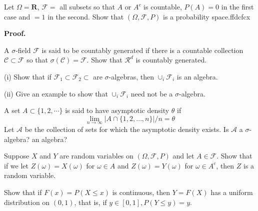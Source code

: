 \documentclass[en, normal, 11pt, black]{elegantnote}
\newenvironment{exercise}[1]{\begin{tcolorbox}[title=#1]}{\end{tcolorbox}}
\renewcommand{\proof}{\textbf{Proof. }}
\begin{document}
    \begin{exercise}{1.1.1}
        Let $\Omega=\mathbf{R}$, $\mathcal{F}=$ all subsets so that $A$ or $A^c$ is countable, $P(A) = 0$ in the first case and $= 1$ in the second. Show that $(\Omega,\mathcal{F},P)$ is a probability space.ffdcfcx
    \end{exercise}
    \proof

    \begin{exercise}{1.1.3}
        A $\sigma$-field $\mathcal{F}$ is said to be countably generated if there is a countable collection $\mathcal{C} \subset \mathcal{F}$ so that $\sigma(\mathcal{C}) = \mathcal{F}$. Show that $\mathcal{R}^d$ is countably generated. 
    \end{exercise}

    \begin{exercise}{1.1.4}
        (i) Show that if $\mathcal{F}_1\subset\mathcal{F}_2\subset$ are $\sigma$-algebras, then $\cup_i\mathcal{F}_i$ is an algebra. 
        
        (ii) Give an example to show that $\cup_i\mathcal{F}_i$ need not be a $\sigma$-algebra. 
    \end{exercise}

    \begin{exercise}{1.1.5}
        A set $A \subset \{1,2, \cdots\}$ is said to have asymptotic density $\theta$ if
        \[
        \lim _{n \rightarrow \infty}|A \cap\{1,2, \ldots, n\}| / n=\theta
        \]
        Let $\mathcal{A}$ be the collection of sets for which the asymptotic density exists. Is $\mathcal{A}$ a $\sigma$-algebra? an algebra?
    \end{exercise}

    \begin{exercise}{1.2.1}
        Suppose $X$ and $Y$ are random variables on $(\Omega, \mathcal{F}, P)$ and let $A \in \mathcal{F}$. Show that if we let $Z(\omega)=X(\omega)$ for $\omega \in A$ and $Z(\omega)=Y(\omega)$ for $\omega \in A^{c}$, then $Z$ is a random variable.
    \end{exercise}

    \begin{exercise}{1.2.4}
        Show that if $F(x)=P(X \leq x)$ is continuous, then $Y=F(X)$ has a uniform distribution on $(0,1)$, that is, if $y \in[0,1], P(Y \leq y)=y$.
    \end{exercise}
\end{document}
